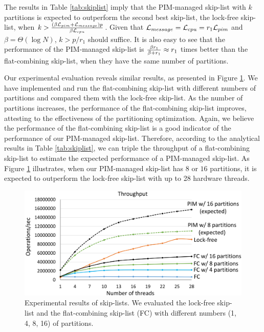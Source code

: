 The results in Table \ref{tab:skiplist} imply that the PIM-managed
skip-list with $k$ partitions is expected to outperform the second
best skip-list, the lock-free skip-list, when $k > {(\beta\mathcal{L}_{pim} +
  \mathcal{L}_{message})p \over \beta\mathcal{L}_{cpu}}$.  Given that $\mathcal{L}_{message} = \mathcal{L}_{cpu} =
r_1\mathcal{L}_{pim}$ and $\beta = \Theta(\log N)$, $k > p/r_1$ should suffice.
It is also easy to see that the performance of the PIM-managed
skip-list is ${\beta r_1 \over \beta + r_1} \approx r_1$ times better
than the flat-combining skip-list, when they have the same number of
partitions.

Our experimental evaluation reveals similar results, as presented in
Figure \ref{figure:skiplist_data}.  We have implemented and run the
flat-combining skip-list with different numbers of partitions and
compared them with the lock-free skip-list.  As the number of
partitions increases, the performance of the flat-combining skip-list
improves, attesting to the effectiveness of the partitioning
optimization.  Again, we believe the performance of the flat-combining
skip-list is a good indicator of the performance of our PIM-managed
skip-list.  Therefore, according to the analytical results in Table
\ref{tab:skiplist}, we can triple the throughput of a flat-combining
skip-list to estimate the expected performance of a PIM-managed
skip-list.  As Figure \ref{figure:skiplist_data} illustrates, when our
PIM-managed skip-list has $8$ or $16$ partitions, it is expected to
outperform the lock-free skip-list with up to 28 hardware threads.

\begin{figure}[ht!]
    \centering
    \includegraphics[width=1.0\linewidth]{skiplist_data.eps} %
    \caption{Experimental results of skip-lists. We evaluated the lock-free skip-list and 
    the flat-combining skip-list (FC) with different numbers (1, 4, 8, 16) of partitions.}
    \label{figure:skiplist_data}
\end{figure}


